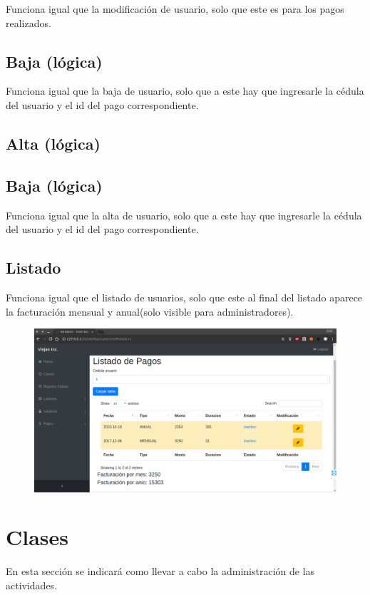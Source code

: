 \documentclass[a4paper, 12pt, spanish]{report}
\begin{document}
\par Funciona igual que la modificación de usuario, solo que este es para los pagos realizados.
\subsection{Baja (lógica)}
\par Funciona igual que la baja de usuario, solo que a este hay que ingresarle la cédula del usuario y el id del pago correspondiente.
\subsection{Alta (lógica)}
\subsection{Baja (lógica)}
\par Funciona igual que la alta de usuario, solo que a este hay que ingresarle la cédula del usuario y el id del pago correspondiente.
\subsection{Listado}
\par Funciona igual que el listado de usuarios, solo que este al final del listado aparece la facturación mensual y anual(solo visible para administradores).
\begin{figure}[H]
	\centering
	\includegraphics[width=\linewidth]{imagenes/pa_list_us}
	\label{fig:palistus}
\end{figure}

\newpage
\section{Clases}
En esta sección se indicará como llevar a cabo la administración de las actividades.
\end{document}

